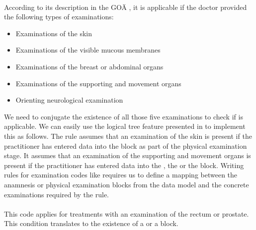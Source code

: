 \paragraph{}
According to its description in the GOÄ \cite{hermanns2015ebm}, it is applicable if the doctor provided the following types of examinations:
\begin{itemize}
    \item Examinations of the skin
    \item Examinations of the visible mucous membranes
    \item Examinations of the breast or abdominal organs
    \item Examinations of the supporting and movement organs
    \item Orienting neurological examination
\end{itemize}
We need to conjugate the existence of all those five examinations to check if  is applicable.
We can easily use the logical tree feature presented in \addref to implement this as follows.
The rule assumes that an examination of the skin is present if the practitioner has entered data into the  block as part of the physical examination stage.
It assumes that an examination of the supporting and movement organs is present if the practitioner has entered data into the , the  or the  block.
Writing rules for examination codes like  requires us to define a mapping between the anamnesis or physical examination blocks from the \AV data model and the concrete examinations required by the rule.




\paragraph{}
This code applies for treatments with an examination of the rectum or prostate.
This condition translates to the existence of a  or a  block.





